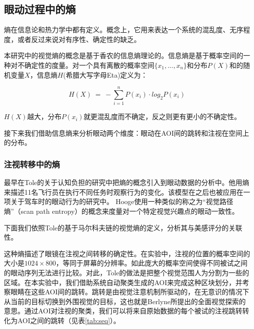 \subsection{眼动过程中的熵}
熵在信息论和热力学中都有定义。概念上，它用来表达一个系统的混乱度、无序程度，或者反过来说对有序性、确定性的缺乏。

本研究中的视觉熵的概念是基于香农的信息熵理论的。信息熵是基于概率空间的一种对不确定性的度量。对一个具有离散的概率空间$\{x_1, ..., x_n\}$和分布$P(X)$和的随机变量$X$，信息熵$H$(希腊大写字母Eta)定义为：

$$H(X)~=~-\sum_{i=1}^n P(x_i)\cdot log_{2}P(x_i)$$

$H(X)$越大，分布$P(x_i)$就更混乱度而不确定，反之则更有更小的不确定性。

接下来我们借助信息熵来分析眼动两个维度：眼动在AOI间的跳转和注视在空间上的分布。

\subsubsection{注视转移中的熵}
最早在Tole\cite{Tole1983}的关于认知负担的研究中把熵的概念引入到眼动数据的分析中。他用熵来描述11名飞行员在执行不同任务时观察行为的变化。该模型在之后也被应用在一项关于驾车时的眼动行为的研究\cite{Gilland2008}中。
Hooge\cite{Hooge2013}使用一种类似的称之为“视觉路径熵”（scan path entropy）的概念来度量对一个特定视觉兴趣点的眼动一致性。

下面我们依照Tole的基于马尔科夫链的视觉熵的定义，分析其与美感评分的关联性。

这种熵描述了眼镜在注视之间转移的确定性。在实验中，注视的位置的概率空间的大小是$1024\times800$，等同于屏幕的分辨率。如此庞大的概率空间使得不同被试之间的眼动序列无法进行比较。对此，Tole的做法是把整个视觉范围人为分割为一些的区域。在本实验中，我们借助系统自动聚类生成的AOI来完成这种区块划分，并考察眼睛在这些AOI间的跳转。跳转是由视觉注意机制所驱动的，在无意识的情况下从当前的目标切换到外围视觉的目标\cite{Henderson1993}，这也就是Berlyne\cite{Berlyne1971}所提出的全面视觉探索的意思。通过AOI对注视的聚类，我们可以将来自原始数据的每个被试的注视跳转转化为AOI之间的跳转（见表\ref{tab:seq}）。


